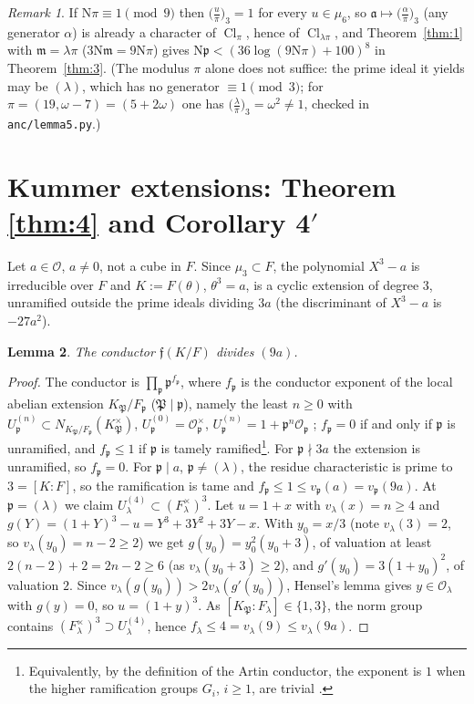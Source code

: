 \documentclass[11pt]{article}
\newtheorem{lemma}{Lemma}[section]
\theoremstyle{definition}
\theoremstyle{remark}
\newtheorem{remark}[lemma]{Remark}
\numberwithin{equation}{section}
\newcommand{\cO}{\mathcal O}
\newcommand{\fa}{\mathfrak a}
\newcommand{\fp}{\mathfrak p}
\newcommand{\fP}{\mathfrak P}
\newcommand{\fm}{\mathfrak m}
\newcommand{\ff}{\mathfrak f}
\newcommand{\Nm}{\mathrm N}
\newcommand{\Cl}{\operatorname{Cl}}
\newcommand{\cubic}[2]{\bigl(\tfrac{#1}{#2}\bigr)_{3}}
\begin{document}
\begin{remark}\label{rem:mod9}
If $\Nm\pi\equiv1\pmod9$ then $\cubic{u}{\pi}=1$ for every $u\in\mu_6$, so $\fa\mapsto\cubic{\alpha}{\pi}$ (any generator $\alpha$) is already a character of $\Cl_\pi$, hence of $\Cl_{\lambda\pi}$, and Theorem~\ref{thm:1} with $\fm=\lambda\pi$ ($3\Nm\fm=9\Nm\pi$) gives $\Nm\fp<(36\log(9\Nm\pi)+100)^8$ in Theorem~\ref{thm:3}. (The modulus $\pi$ alone does not suffice: the prime ideal it yields may be $(\lambda)$, which has no generator $\equiv1\pmod3$; for $\pi=(19,\omega-7)=(5+2\omega)$ one has $\cubic{\lambda}{\pi}=\omega^2\ne1$, checked in \texttt{anc/lemma5.py}.)
\end{remark}

\section{Kummer extensions: Theorem \texorpdfstring{\ref{thm:4}}{4} and Corollary \texorpdfstring{4$'$}{4'}}\label{sec:kummer}

Let $a\in\cO$, $a\ne0$, not a cube in $F$. Since $\mu_3\subset F$, the polynomial $X^3-a$ is irreducible over $F$ and $K:=F(\theta)$, $\theta^3=a$, is a cyclic extension of degree $3$, unramified outside the prime ideals dividing $3a$ (the discriminant of $X^3-a$ is $-27a^2$).

\begin{lemma}\label{lem:conductor}
The conductor $\ff(K/F)$ divides $(9a)$.
\end{lemma}

\begin{proof}
The conductor is $\prod_\fp\fp^{f_\fp}$, where $f_\fp$ is the conductor exponent of the local abelian extension $K_\fP/F_\fp$ ($\fP\mid\fp$), namely the least $n\ge0$ with $U^{(n)}_\fp\subset N_{K_\fP/F_\fp}(K_\fP^\times)$, $U^{(0)}_\fp=\cO_\fp^\times$, $U^{(n)}_\fp=1+\fp^n\cO_\fp$ \cite[Chapter~V, \S1, and Chapter~VI, \S6]{neukirch1999}; $f_\fp=0$ if and only if $\fp$ is unramified, and $f_\fp\le1$ if $\fp$ is tamely ramified\footnote{Equivalently, by the definition of the Artin conductor, the exponent is $1$ when the higher ramification groups $G_i$, $i\ge1$, are trivial \cite[Chapter~VI, \S2; Chapter~XV, \S2]{serre1979}.}. For $\fp\nmid3a$ the extension is unramified, so $f_\fp=0$. For $\fp\mid a$, $\fp\ne(\lambda)$, the residue characteristic is prime to $3=[K:F]$, so the ramification is tame and $f_\fp\le1\le v_\fp(a)=v_\fp(9a)$. At $\fp=(\lambda)$ we claim $U^{(4)}_\lambda\subset(F_\lambda^\times)^3$. Let $u=1+x$ with $v_\lambda(x)=n\ge4$ and $g(Y)=(1+Y)^3-u=Y^3+3Y^2+3Y-x$. With $y_0=x/3$ (note $v_\lambda(3)=2$, so $v_\lambda(y_0)=n-2\ge2$) we get $g(y_0)=y_0^2(y_0+3)$, of valuation at least $2(n-2)+2=2n-2\ge6$ (as $v_\lambda(y_0+3)\ge2$), and $g'(y_0)=3(1+y_0)^2$, of valuation $2$. Since $v_\lambda(g(y_0))>2v_\lambda(g'(y_0))$, Hensel's lemma \cite[Chapter~II, \S2]{lang1994} gives $y\in\cO_\lambda$ with $g(y)=0$, so $u=(1+y)^3$. As $[K_\fP:F_\lambda]\in\{1,3\}$, the norm group contains $(F_\lambda^\times)^3\supset U^{(4)}_\lambda$, hence $f_\lambda\le4=v_\lambda(9)\le v_\lambda(9a)$.
\end{proof}
\end{document}
